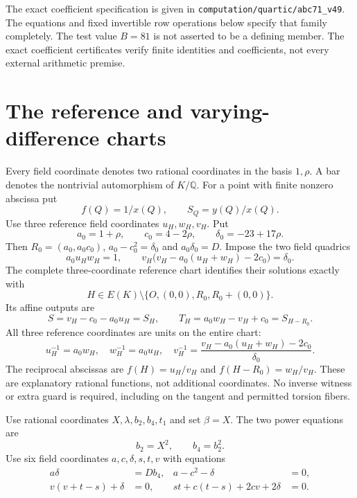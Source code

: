 \documentclass[11pt,a4paper]{article}
\newcommand{\Q}{\mathbb Q}\newcommand{\Z}{\mathbb Z}
\begin{document}
The exact coefficient specification is given in
\nolinkurl{computation/quartic/abc71_v49}. The equations and fixed
invertible row operations below specify that family completely.
The test value $B=81$ is not asserted to be a defining member.
The exact coefficient certificates verify finite identities and
coefficients, not every external arithmetic premise.

\section{The reference and varying-difference charts}
Every field coordinate denotes two rational coordinates in the basis
$1,\rho$. A bar denotes the nontrivial automorphism of $K/\Q$.
For a point with finite nonzero abscissa put
\[
                    f(Q)=1/x(Q),\qquad S_Q=y(Q)/x(Q).
\]
Use three reference field coordinates $u_H,w_H,v_H$. Put
\[
 a_0=1+\rho,\qquad c_0=4-2\rho,\qquad
 \delta_0=-23+17\rho.
\]
Then $R_0=(a_0,a_0c_0)$, $a_0-c_0^2=\delta_0$ and
$a_0\delta_0=D$. Impose the two field quadrics
\begin{equation}\label{eq:reference}
 a_0u_Hw_H=1,\qquad
 v_H\bigl(v_H-a_0(u_H+w_H)-2c_0\bigr)=\delta_0.
\end{equation}
The complete three-coordinate reference chart
\cite[Theorem~1.1 and Section~4]{Reference} identifies their
solutions exactly with
\[
 H\in E(K)\setminus\{O,(0,0),R_0,R_0+(0,0)\}.
\]
Its affine outputs are
\begin{equation}\label{eq:referenceoutputs}
 S=v_H-c_0-a_0u_H=S_H,\qquad
 T_H=a_0w_H-v_H+c_0=S_{H-R_0}.
\end{equation}
All three reference coordinates are units on the entire chart:
\[
 u_H^{-1}=a_0w_H,\quad w_H^{-1}=a_0u_H,\quad
 v_H^{-1}=\frac{v_H-a_0(u_H+w_H)-2c_0}{\delta_0}.
\]
The reciprocal abscissas are $f(H)=u_H/v_H$ and
$f(H-R_0)=w_H/v_H$. These are explanatory rational functions,
not additional coordinates. No inverse witness or extra guard
is required, including on the tangent and permitted torsion fibers.

Use rational coordinates $X,\lambda,b_2,b_4,t_1$ and set $\beta=X$.
The two power equations are
\begin{equation}\label{eq:powers}
                         b_2=X^2,\qquad b_4=b_2^2.
\end{equation}
Use six field coordinates $a,c,\delta,s,t,v$ with equations
\begin{equation}\label{eq:pair}
\begin{aligned}
 a\delta&=Db_4,& a-c^2-\delta&=0,\\
 v(v+t-s)+\delta&=0,&
 st+c(t-s)+2cv+2\delta&=0.
\end{aligned}
\end{equation}
\end{document}
